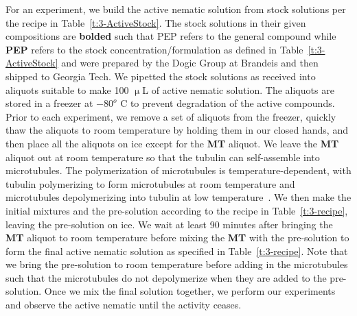 For an experiment, we build the active nematic solution from stock solutions per the recipe in Table~\ref{t:3-ActiveStock}.
The stock solutions in their given compositions are {\bf bolded} such that PEP refers to the general compound while {\bf PEP} refers to the stock concentration/formulation as defined in Table~\ref{t:3-ActiveStock} and were prepared by the Dogic Group at Brandeis and then shipped to Georgia Tech.
We pipetted the stock solutions as received into aliquots suitable to make 100 $\upmu$L of active nematic solution.
The aliquots are stored in a freezer at $-80^o$ C to prevent degradation of the active compounds.
Prior to each experiment, we remove a set of aliquots from the freezer, quickly thaw the aliquots to room temperature by holding them in our closed hands, and then place all the aliquots on ice except for the {\bf MT} aliquot.
We leave the {\bf MT} aliquot out at room temperature so that the tubulin can self-assemble into microtubules.
The polymerization of microtubules is temperature-dependent, with tubulin polymerizing to form microtubules at room temperature and microtubules depolymerizing into tubulin at low temperature~\cite{RN3}.
We then make the initial mixtures and the pre-solution according to the recipe in Table~\ref{t:3-recipe}, leaving the pre-solution on ice.
We wait at least 90 minutes after bringing the {\bf MT} aliquot to room temperature before mixing the {\bf MT} with the pre-solution to form the final active nematic solution as specified in Table~\ref{t:3-recipe}.
Note that we bring the pre-solution to room temperature before adding in the microtubules such that the microtubules do not depolymerize when they are added to the pre-solution.
Once we mix the final solution together, we perform our experiments and observe the active nematic until the activity ceases.
